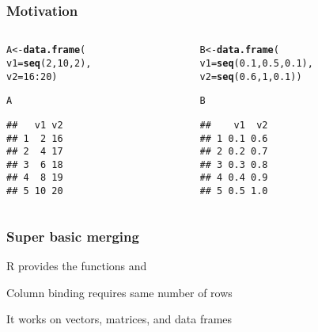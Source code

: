 \documentclass[12pt]{beamer}\usepackage[]{graphicx}\usepackage[]{color}
\makeatletter
\newcommand{\hlnum}[1]{\textcolor[rgb]{0.686,0.059,0.569}{#1}}%
\newcommand{\hlopt}[1]{\textcolor[rgb]{0,0,0}{#1}}%
\newcommand{\hlstd}[1]{\textcolor[rgb]{0.345,0.345,0.345}{#1}}%
\newcommand{\hlkwb}[1]{\textcolor[rgb]{0.69,0.353,0.396}{#1}}%
\newcommand{\hlkwc}[1]{\textcolor[rgb]{0.333,0.667,0.333}{#1}}%
\newcommand{\hlkwd}[1]{\textcolor[rgb]{0.737,0.353,0.396}{\textbf{#1}}}%
\newenvironment{kframe}{%
 \def\at@end@of@kframe{}%
 \ifinner\ifhmode%
  \def\at@end@of@kframe{\end{minipage}}%
  \begin{minipage}{\columnwidth}%
 \fi\fi%
 \def\FrameCommand##1{\hskip\@totalleftmargin \hskip-\fboxsep
 \colorbox{shadecolor}{##1}\hskip-\fboxsep
     \hskip-\linewidth \hskip-\@totalleftmargin \hskip\columnwidth}%
 \MakeFramed {\advance\hsize-\width
   \@totalleftmargin\z@ \linewidth\hsize
   \@setminipage}}%
 {\par\unskip\endMakeFramed%
 \at@end@of@kframe}
\newenvironment{knitrout}{}{} %
\makeatother
\begin{document}
\begin{frame}[fragile]
\frametitle{Motivation}

\begin{columns}[t]
\begin{column}{0.4\textwidth}
\begin{knitrout}\footnotesize
{}\color{fgcolor}\begin{kframe}
\begin{alltt}
\hlstd{A} \hlkwb{<-} \hlkwd{data.frame}\hlstd{(}
  \hlkwc{v1} \hlstd{=} \hlkwd{seq}\hlstd{(}\hlnum{2}\hlstd{,} \hlnum{10}\hlstd{,} \hlnum{2}\hlstd{),}
  \hlkwc{v2} \hlstd{=} \hlnum{16}\hlopt{:}\hlnum{20}\hlstd{)}

\hlstd{A}
\end{alltt}
\begin{verbatim}
##   v1 v2
## 1  2 16
## 2  4 17
## 3  6 18
## 4  8 19
## 5 10 20
\end{verbatim}
\end{kframe}
\end{knitrout}
\end{column}

\begin{column}{0.5\textwidth}
\begin{knitrout}\footnotesize
{}\color{fgcolor}\begin{kframe}
\begin{alltt}
\hlstd{B} \hlkwb{<-} \hlkwd{data.frame}\hlstd{(}
  \hlkwc{v1} \hlstd{=} \hlkwd{seq}\hlstd{(}\hlnum{0.1}\hlstd{,} \hlnum{0.5}\hlstd{,} \hlnum{0.1}\hlstd{),}
  \hlkwc{v2} \hlstd{=} \hlkwd{seq}\hlstd{(}\hlnum{0.6}\hlstd{,} \hlnum{1}\hlstd{,} \hlnum{0.1}\hlstd{))}

\hlstd{B}
\end{alltt}
\begin{verbatim}
##    v1  v2
## 1 0.1 0.6
## 2 0.2 0.7
## 3 0.3 0.8
## 4 0.4 0.9
## 5 0.5 1.0
\end{verbatim}
\end{kframe}
\end{knitrout}
\end{column}
\end{columns}

\end{frame}


\begin{frame}[fragile]
\frametitle{Super basic merging}

\bi
  \item R provides the functions {\hilit {}} and {\hilit {}}
  \item Column binding requires same number of rows
  \item It works on vectors, matrices, and data frames
\ei

\end{frame}
\end{document}
